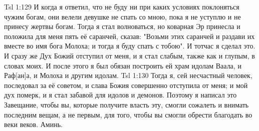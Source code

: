 \vs Tsl 1:129 
И когда я ответил, что не буду ни при каких условиях поклоняться чужим богам, они велели девушке не спать со мною, пока я не уступлю и не принесу жертвы богам. Тогда я стал волноваться, но коварная Эр принесла и положила для меня пять её саранчей, сказав: "Возьми этих саранчей и раздави их вместе во имя бога Молоха; и тогда я буду спать с тобою". И тотчас я сделал это. И сразу же Дух Божий отступил от меня, и я стал слабым, также как и глупым, в словах моих. И после этого я был обязан построить ей храм идолам Ваала, и Раф[ан]а, и Молоха и другим идолам.
\vs Tsl 1:130 
Тогда я, сей несчастный человек, последовал за её советом, и слава Божия совершенно отступила от меня; и мой дух померк, и я стал забавой для идолов и демонов. Поэтому я написал это Завещание, чтобы вы, которые получите власть эту, смогли сожалеть и внимать последним вещам, а не первым, для того, чтобы вы смогли обрести благодать во веки веков. Аминь.

